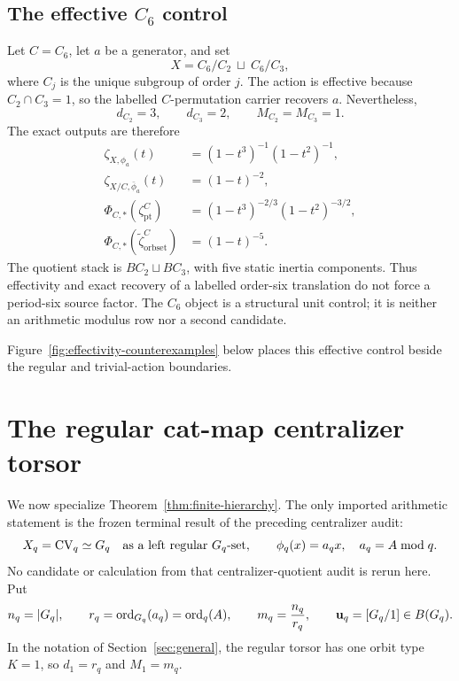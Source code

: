 \documentclass[11pt]{article}
\theoremstyle{definition}
\theoremstyle{remark}
\begin{document}
\subsection{The effective \texorpdfstring{\(C_6\)}{C6} control}

Let \(C=C_6\), let \(a\) be a generator, and set
\begin{equation}
  X=C_6/C_2\ \sqcup\ C_6/C_3,
  \label{eq:c6-control}
\end{equation}
where \(C_j\) is the unique subgroup of order \(j\).  The action is effective
because \(C_2\cap C_3=1\), so the labelled \(C\)-permutation carrier recovers
\(a\).  Nevertheless,
\[
  d_{C_2}=3,\qquad d_{C_3}=2,\qquad
  M_{C_2}=M_{C_3}=1.
\]
The exact outputs are therefore
\begin{align}
  \zeta_{X,\phi_a}(t)
    &=(1-t^3)^{-1}(1-t^2)^{-1},
    \label{eq:c6-source}\\
  \zeta_{X/C,\bar\phi_a}(t)
    &=(1-t)^{-2},
    \label{eq:c6-coarse}\\
  \Phi_{C,*}(\zeta_{\mathrm{pt}}^C)
    &=(1-t^3)^{-2/3}(1-t^2)^{-3/2},
    \label{eq:c6-point-orbifold}\\
  \Phi_{C,*}(\widetilde\zeta_{\mathrm{orbset}}^C)
    &=(1-t)^{-5}.
    \label{eq:c6-orbit-orbifold}
\end{align}
The quotient stack is \(BC_2\sqcup BC_3\), with five static inertia
components.  Thus effectivity and exact recovery of a labelled order-six
translation do not force a period-six source factor.  The \(C_6\) object is
a structural unit control; it is neither an arithmetic modulus row nor a
second candidate.

Figure~\ref{fig:effectivity-counterexamples} below places this effective
control beside the regular and trivial-action boundaries.

\section{The regular cat-map centralizer torsor}
\label{sec:cat-specialization}

We now specialize Theorem~\ref{thm:finite-hierarchy}.  The only imported
arithmetic statement is the frozen terminal result of the preceding
centralizer audit:
\begin{equation}
  X_q=\mathrm{CV}_q\simeq G_q
  \quad\text{as a left regular \(G_q\)-set},
  \qquad
  \phi_q(x)=a_qx,
  \quad a_q=A\bmod q.
  \label{eq:regular-torsor}
\end{equation}
No candidate or calculation from that centralizer-quotient audit is rerun here.  Put
\begin{equation}
  n_q=|G_q|,
  \qquad
  r_q=\operatorname{ord}_{G_q}(a_q)=\operatorname{ord}_q(A),
  \qquad
  m_q=\frac{n_q}{r_q},
  \qquad
  \mathbf u_q=[G_q/1]\in B(G_q).
  \label{eq:n-r-m}
\end{equation}
In the notation of Section~\ref{sec:general}, the regular torsor has one
orbit type \(K=1\), so \(d_1=r_q\) and \(M_1=m_q\).
\end{document}
